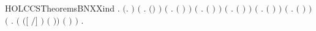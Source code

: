 \newcommand{\HOLCCSTheoremsBNXXdef}{\UseVerbatim{HOLCCSTheoremsBNXXdef}}
\begin{SaveVerbatim}{HOLCCSTheoremsBNXXind}
\HOLTokenTurnstile{} \HOLSymConst{\HOLTokenForall{}}.
       \ensuremath{(}\HOLSymConst{\HOLTokenForall{}}.   \ensuremath{)} \HOLSymConst{\HOLTokenConj{}} \ensuremath{(}\HOLSymConst{\HOLTokenForall{}}  .    \HOLSymConst{\HOLTokenImp{}}  \ensuremath{(}\HOLSymConst{\ensuremath{\ldotp}}\ensuremath{)} \ensuremath{)} \HOLSymConst{\HOLTokenConj{}}
       \ensuremath{(}\HOLSymConst{\HOLTokenForall{}}  .    \HOLSymConst{\HOLTokenConj{}}    \HOLSymConst{\HOLTokenImp{}}  \ensuremath{(} \HOLSymConst{\ensuremath{+}} \ensuremath{)} \ensuremath{)} \HOLSymConst{\HOLTokenConj{}}
       \ensuremath{(}\HOLSymConst{\HOLTokenForall{}}  .    \HOLSymConst{\HOLTokenConj{}}    \HOLSymConst{\HOLTokenImp{}}  \ensuremath{(} \HOLSymConst{\ensuremath{\mid}} \ensuremath{)} \ensuremath{)} \HOLSymConst{\HOLTokenConj{}}
       \ensuremath{(}\HOLSymConst{\HOLTokenForall{}}  .    \HOLSymConst{\HOLTokenImp{}}  \ensuremath{(}  \ensuremath{)} \ensuremath{)} \HOLSymConst{\HOLTokenConj{}}
       \ensuremath{(}\HOLSymConst{\HOLTokenForall{}}  .    \HOLSymConst{\HOLTokenImp{}}  \ensuremath{(}  \ensuremath{)} \ensuremath{)} \HOLSymConst{\HOLTokenConj{}}
       \ensuremath{(}\HOLSymConst{\HOLTokenForall{}} .  \ensuremath{(} \ensuremath{)} \ensuremath{)} \HOLSymConst{\HOLTokenConj{}}
       \ensuremath{(}\HOLSymConst{\HOLTokenForall{}}  .
            \ensuremath{(}   \HOLSymConst{\HOLTokenImp{}}  \ensuremath{(}\ensuremath{[}  \ensuremath{/}\ensuremath{]} \ensuremath{)} \ensuremath{(}  \ensuremath{)}\ensuremath{)} \HOLSymConst{\HOLTokenImp{}}
             \ensuremath{(}  \ensuremath{)} \ensuremath{)} \HOLSymConst{\HOLTokenImp{}}
       \HOLSymConst{\HOLTokenForall{}} .   
\end{SaveVerbatim}
